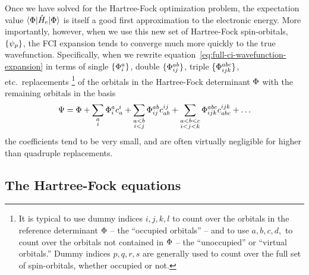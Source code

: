 \documentclass[11pt]{article}
\numberwithin{equation}{section}
\begin{document}
Once we have solved for the Hartree-Fock optimization problem, the expectation value $\langle\Phi |\hat{H}_e|\Phi \rangle$ is itself a good first approximation to the electronic energy.
More importantly, however, when we use this new set of Hartree-Fock spin-orbitals, $\{\psi _p\}$, the FCI expansion tends to converge much more quickly to the true wavefunction.
Specifically, when we rewrite equation~\ref{eq:full-ci-wavefunction-expansion} in terms of single $\{\Phi _i^a\}$, double $\{\Phi _{ij}^{ab}\}$, triple $\{\Phi _{ijk}^{abc}\}$, etc.\ replacements \footnote{It is typical to use dummy indices $i,j,k,l$ to count over the orbitals in the reference determinant $\Phi $ -- the ``occupied orbitals'' -- and to use $a,b,c,d,$ to count over the orbitals not contained in $\Phi $ -- the ``unoccupied'' or ``virtual orbitals.''  Dummy indices $p,q,r,s$ are generally used to count over the full set of spin-orbitals, whether occupied or not.} of the orbitals in the Hartree-Fock determinant $\Phi $ with the remaining orbitals in the basis
\begin{align}
  \Psi 
=
  \Phi 
+
  \sum_{\substack{a\\i}}
  \Phi _i^ac_a^i
+
  \sum_{\substack{a<b\\i<j}}
  \Phi _{ij}^{ab}c_{ab}^{ij}
+
  \sum_{\substack{a<b<c\\i<j<k}}
  \Phi _{ijk}^{abc}c_{abc}^{ijk}
+\ldots
\end{align}
the coefficients tend to be very small, and are often virtually negligible for higher than quadruple replacements.

\subsection{The Hartree-Fock equations}
\end{document}
